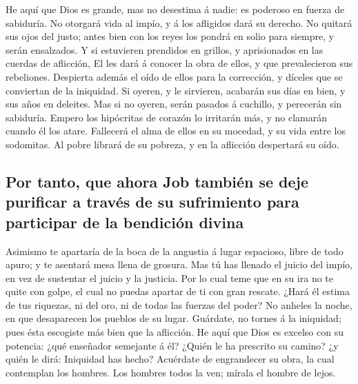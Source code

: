  He aquí que Dios es grande, mas no desestima á nadie: es
poderoso en fuerza de sabiduría.  No otorgará vida al
impío, y á los afligidos dará su derecho.  No quitará sus
ojos del justo; antes bien con los reyes los pondrá en solio para
siempre, y serán ensalzados.  Y si estuvieren prendidos en
grillos, y aprisionados en las cuerdas de aflicción,  El
les dará á conocer la obra de ellos, y que prevalecieron sus rebeliones.
 Despierta además el oído de ellos para la corrección, y
díceles que se conviertan de la iniquidad.  Si oyeren, y
le sirvieren, acabarán sus días en bien, y sus años en deleites.
 Mas si no oyeren, serán pasados á cuchillo, y perecerán
sin sabiduría.  Empero los hipócritas de corazón lo
irritarán más, y no clamarán cuando él los atare. 
Fallecerá el alma de ellos en su mocedad, y su vida entre los sodomitas.
 Al pobre librará de su pobreza, y en la aflicción
despertará su oído.

\hypertarget{por-tanto-que-ahora-job-tambiuxe9n-se-deje-purificar-a-travuxe9s-de-su-sufrimiento-para-participar-de-la-bendiciuxf3n-divina}{%
\subsection{Por tanto, que ahora Job también se deje purificar a través
de su sufrimiento para participar de la bendición
divina}\label{por-tanto-que-ahora-job-tambiuxe9n-se-deje-purificar-a-travuxe9s-de-su-sufrimiento-para-participar-de-la-bendiciuxf3n-divina}}

 Asimismo te apartaría de la boca de la angustia á lugar
espacioso, libre de todo apuro; y te asentará mesa llena de grosura.
 Mas tú has llenado el juicio del impío, en vez de
sustentar el juicio y la justicia.  Por lo cual teme que
en su ira no te quite con golpe, el cual no puedas apartar de ti con
gran rescate.  ¿Hará él estima de tus riquezas, ni del
oro, ni de todas las fuerzas del poder?  No anheles la
noche, en que desaparecen los pueblos de su lugar. 
Guárdate, no tornes á la iniquidad; pues ésta escogiste más bien que la
aflicción.  He aquí que Dios es excelso con su potencia:
¿qué enseñador semejante á él?  ¿Quién le ha prescrito su
camino? ¿y quién le dirá: Iniquidad has hecho?  Acuérdate
de engrandecer su obra, la cual contemplan los hombres. 
Los hombres todos la ven; mírala el hombre de lejos.

